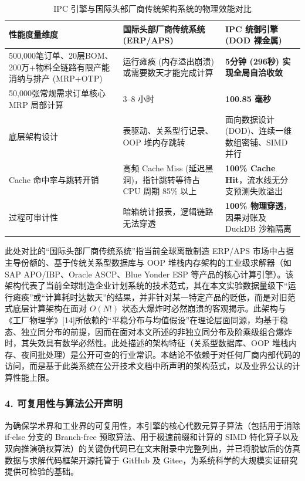 \documentclass[11pt,a4paper]{article}
\begin{document}
\begin{table}[htbp]
\centering
\begin{threeparttable}
\caption{IPC 引擎与国际头部厂商传统架构系统的物理效能对比}
\label{tab:performance_comparison}
\begin{tabular}{p{4.5cm}p{4.5cm}p{4.5cm}}
\toprule
\textbf{性能度量维度} & \textbf{国际头部厂商传统系统 (ERP/APS)}\tnote{1} & \textbf{IPC 统御引擎 (DOD 裸金属)} \\
\midrule
500,000笔订单、20层BOM、200万+物料全链路有限产能消纳与排产 (MRP+OTP) & 运行瘫痪 (内存溢出崩溃) 或需要数天才能完成计算 & \textbf{5分钟 (296秒) 实现全局自洽收敛} \\
\midrule
50,000张常规需求订单核心 MRP 局部计算 & 3–8 小时 & \textbf{100.85 毫秒} \\
\midrule
底层架构设计 & 表驱动、关系型行记录、OOP 堆内存跳转 & 面向数据设计 (DOD)、连续一维数组密铺、SIMD 并行 \\
\midrule
Cache 命中率与跳转开销 & 高频 Cache Miss (延迟黑洞)，指针跳转等待占 CPU 周期 85\% 以上 & \textbf{100\% Cache Hit}，流水线无分支预测失败溢出 \\
\midrule
过程可审计性 & 暗箱统计报表，逻辑链路无法穿透 & \textbf{100\% 物理穿透}，因果对账及 DuckDB 沙箱隔离 \\
\bottomrule
\end{tabular}
\begin{tablenotes}
\footnotesize
\item[1] 此处对比的“国际头部厂商传统系统”指当前全球离散制造 ERP/APS 市场中占据主导份额的、基于传统关系型数据库与 OOP 堆栈内存架构的工业级求解器（如 SAP APO/IBP、Oracle ASCP、Blue Yonder ESP 等产品的核心计算引擎）。该架构代表了当前全球制造企业计划系统的技术范式，其在本文实验数据量级下“运行瘫痪”或“计算耗时达数天”的结果，并非针对某一特定产品的贬低，而是对旧范式底层计算架构在面对 $O(N!)$ 状态大爆炸时必然崩溃的客观揭示。此架构与《工厂物理学》[14]所依赖的“平稳分布与均值假设”在理论层面同源，均基于稳态、独立同分布的前提，因而在面对本文所述的非独立同分布及阶乘级组合爆炸时，其失效具有数学必然性。此处描述的架构特征（关系型数据库、OOP 堆栈内存、夜间批处理）是公开可查的行业常识。本结论不依赖于对任何厂商内部代码的访问，而是基于此类系统在公开技术文档中所声明的架构范式，以及业界公认的计算性能上限。
\end{tablenotes}
\end{threeparttable}
\end{table}

\subsubsection*{4. 可复用性与算法公开声明}
为确保学术界和工业界的可复用性，本引擎的核心代数元算子算法（包括用于消除 if-else 分支的 Branch-free 预取算法、用于极速前缀和计算的 SIMD 特化算子以及双向推演确权算法）的关键伪代码已在文末附录中完整列出，并已将脱敏后的仿真数据与求解代码框架开源托管于 GitHub 及 Gitee，为系统科学的大规模实证研究提供可检验的基础。
\end{document}
